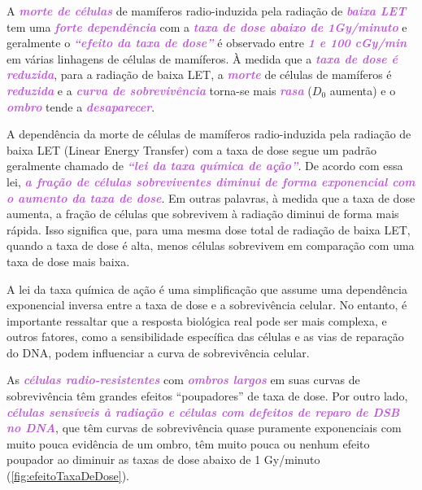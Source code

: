 \documentclass[11pt,a4paper]{article}
\begin{document}
	A \textcolor{MediumOrchid}{\textbf{\textit{morte de células}}} de mamíferos radio-induzida pela radiação de \textcolor{MediumOrchid}{\textbf{\textit{baixa LET}}} tem uma \textcolor{MediumOrchid}{\textbf{\textit{forte dependência}}} com a \textcolor{MediumOrchid}{\textbf{\textit{taxa de dose abaixo de 1Gy/minuto}}} e geralmente o \textcolor{MediumOrchid}{\textbf{\textit{``efeito da taxa de dose''}}} é observado entre \textcolor{MediumOrchid}{\textbf{\textit{1 e 100 cGy/min}}} em várias linhagens de células de mamíferos. À medida que a \textcolor{MediumOrchid}{\textbf{\textit{taxa de dose é reduzida}}}, para a radiação de baixa LET, a \textcolor{MediumOrchid}{\textbf{\textit{morte}}} de células de mamíferos é \textcolor{MediumOrchid}{\textbf{\textit{reduzida}}} e a \textcolor{MediumOrchid}{\textbf{\textit{curva de sobrevivência}}} torna-se mais \textcolor{MediumOrchid}{\textbf{\textit{rasa}}} ($D_0$ aumenta) e o \textcolor{MediumOrchid}{\textbf{\textit{ombro}}} tende a \textcolor{MediumOrchid}{\textbf{\textit{desaparecer}}}.

	A dependência da morte de células de mamíferos radio-induzida pela radiação de baixa LET (Linear Energy Transfer) com a taxa de dose segue um padrão geralmente chamado de \textcolor{MediumOrchid}{\textbf{\textit{``lei da taxa química de ação''}}}. De acordo com essa lei, \textcolor{MediumOrchid}{\textbf{\textit{a fração de células sobreviventes diminui de forma exponencial com o aumento da taxa de dose}}}. Em outras palavras, à medida que a taxa de dose aumenta, a fração de células que sobrevivem à radiação diminui de forma mais rápida. Isso significa que, para uma mesma dose total de radiação de baixa LET, quando a taxa de dose é alta, menos células sobrevivem em comparação com uma taxa de dose mais baixa.

	A lei da taxa química de ação é uma simplificação que assume uma dependência exponencial inversa entre a taxa de dose e a sobrevivência celular. No entanto, é importante ressaltar que a resposta biológica real pode ser mais complexa, e outros fatores, como a sensibilidade específica das células e as vias de reparação do DNA, podem influenciar a curva de sobrevivência celular.

	As \textcolor{MediumOrchid}{\textbf{\textit{células radio-resistentes}}} com \textcolor{MediumOrchid}{\textbf{\textit{ombros largos}}} em suas curvas de sobrevivência têm grandes efeitos ``poupadores'' de taxa de dose. Por outro lado, \textcolor{MediumOrchid}{\textbf{\textit{células sensíveis à radiação e células com defeitos de reparo de DSB no DNA}}}, que têm curvas de sobrevivência quase puramente exponenciais com muito pouca evidência de um ombro, têm muito pouca ou nenhum efeito poupador ao diminuir as taxas de dose abaixo de 1 Gy/minuto (\ref{fig:efeitoTaxaDeDose}).
\end{document}
